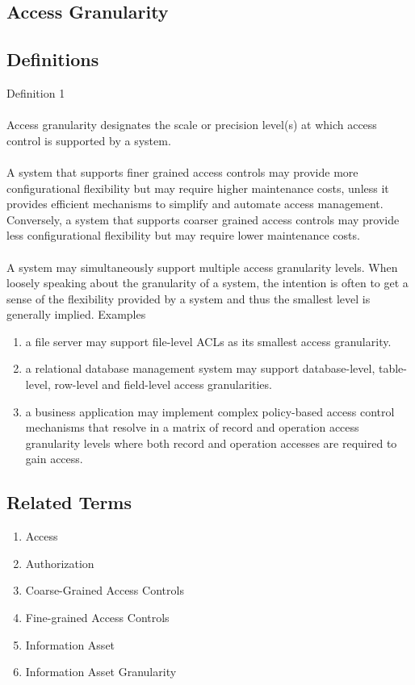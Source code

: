 \newpage \subsection*{Access Granularity } \subsection*{Definitions } \begin{DIC_Def}{Definition 1 }{} \paragraph{} Access granularity designates the scale or precision level(s) at which access control is supported by a system.  \paragraph{} A system that supports finer grained access controls may provide more configurational flexibility but may require higher maintenance costs, unless it provides efficient mechanisms to simplify and automate access management. Conversely, a system that supports coarser grained access controls may provide less configurational flexibility but may require lower maintenance costs.  \paragraph{} A system may simultaneously support multiple access granularity levels. When loosely speaking about the granularity of a system, the intention is often to get a sense of the flexibility provided by a system and thus the smallest level is generally implied.  Examples  \begin{enumerate} \item  a file server may support file-level ACLs as its smallest access granularity.  \item  a relational database management system may support database-level, table-level, row-level and field-level access granularities.  \item  a business application may implement complex policy-based access control mechanisms that resolve in a matrix of record and operation access granularity levels where both record and operation accesses are required to gain access.  \end{enumerate} \end{DIC_Def} \subsection*{Related Terms } \begin{enumerate} \item  Access  \item  Authorization  \item  Coarse-Grained Access Controls  \item  Fine-grained Access Controls  \item  Information Asset  \item  Information Asset Granularity  \end{enumerate} 